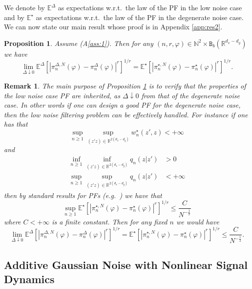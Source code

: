 \documentclass[english,13pt]{article}
\numberwithin{equation}{section}
\newtheorem{rem}{Remark}[section]
\newtheorem{prop}{Proposition}[section]
\begin{document}
We denote by $\mathbb{E}^{\Delta}$ as expectations w.r.t.~the law of the PF in the low noise case and 
by $\mathbb{E}^{\star}$ as expectations w.r.t.~the law of the PF in the degenerate noise case.  We can now state our main result whose proof is in Appendix \ref{app:res2}.
\begin{prop}\label{res:2}
Assume (A\ref{ass:1}).  Then for any $(n,r,\varphi)\in\mathbb{N}^2\times\mathtt{B}_b(\mathbb{R}^{d_x-d_y})$ we have
$$
\lim_{\Delta \downarrow 0}\mathbb{E}^{\Delta}\left[\left|\pi_n^{\Delta,N}(\varphi)-\pi_n^{\Delta}(\varphi)\right|^r\right]^{1/r} = 
\mathbb{E}^{\star}\left[\left|\pi_n^{\star,N}(\varphi)-\pi_n^{\star}(\varphi)\right|^r\right]^{1/r}.
$$
\end{prop}

\begin{rem}\label{rem:1}
The main purpose of Proposition \ref{res:2} is to verify that the properties of the low noise case PF are inherited,  as 
$\Delta \downarrow 0$ from that of the degenerate noise case.  In other words if one can design a good PF for the 
degenerate noise case,  then the low noise filtering problem can be effectively handled.  For instance if one has that
$$
\sup_{n\geq 1}\sup_{(z'z)\in\mathbb{R}^{2(d_x-d_y)}} w_n^{\star}(z',z) <+\infty
$$
and 
\begin{align*}
\inf_{n\geq 1} \inf_{(z'z)\in\mathbb{R}^{2(d_x-d_y)}} q_n(z|z') & >0  \\
\sup_{n\geq 1} \sup_{(z'z)\in\mathbb{R}^{2(d_x-d_y)}} q_n(z|z') & <+\infty
\end{align*}
then by standard results for PFs (e.g.~\cite{delmoral}) we have that
$$
\sup_{n\geq 1} \mathbb{E}^{\star}\left[\left|\pi_n^{\star,N}(\varphi)-\pi_n^{\star}(\varphi)\right|^r\right]^{1/r} \leq 
\frac{C}{N^{-\tfrac{1}{2}}}
$$
where $C<+\infty$ is a finite constant. Then for any fixed $n$ we would have
$$
\lim_{\Delta \downarrow 0}\mathbb{E}^{\Delta}\left[\left|\pi_n^{\Delta,N}(\varphi)-\pi_n^{\Delta}(\varphi)\right|^r\right]^{1/r} = 
\mathbb{E}^{\star}\left[\left|\pi_n^{\star,N}(\varphi)-\pi_n^{\star}(\varphi)\right|^r\right]^{1/r} \leq 
\frac{C}{N^{-\tfrac{1}{2}}}.
$$
\end{rem}

\subsection{Additive Gaussian Noise with Nonlinear Signal Dynamics}\label{sec:spec_add}
\end{document}
